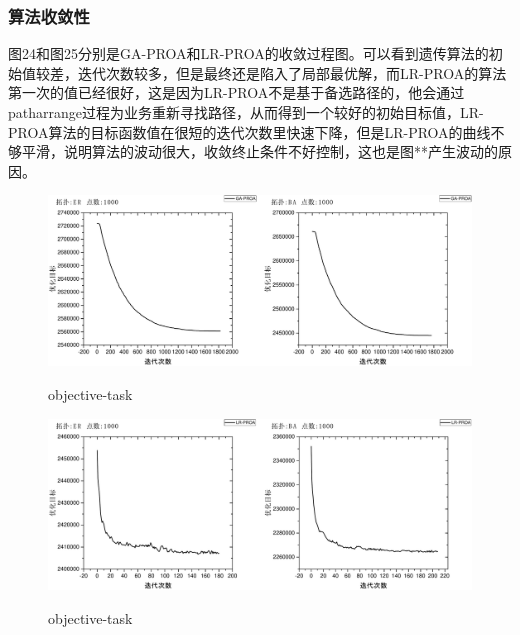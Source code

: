\subsubsection{算法收敛性}
图24和图25分别是GA-PROA和LR-PROA的收敛过程图。可以看到遗传算法的初始值较差，迭代次数较多，但是最终还是陷入了局部最优解，而LR-PROA的算法第一次的值已经很好，这是因为LR-PROA不是基于备选路径的，他会通过patharrange过程为业务重新寻找路径，从而得到一个较好的初始目标值，LR-PROA算法的目标函数值在很短的迭代次数里快速下降，但是LR-PROA的曲线不够平滑，说明算法的波动很大，收敛终止条件不好控制，这也是图**产生波动的原因。
\begin{figure}
\setlength{\belowcaptionskip}{-0.1cm}
  \begin{center}
    {\includegraphics[width=1 \textwidth]{figures/CO-GA-1000.pdf}}
    \end{center}
  \caption{{\footnotesize{objective-task}}}
  \label{IterNum}
\end{figure}
\begin{figure}
\setlength{\belowcaptionskip}{-0.1cm}
  \begin{center}
    {\includegraphics[width=1 \textwidth]{figures/CO-LR-1000.pdf}}
    \end{center}
  \caption{{\footnotesize{objective-task}}}
  \label{IterNum}
\end{figure}






